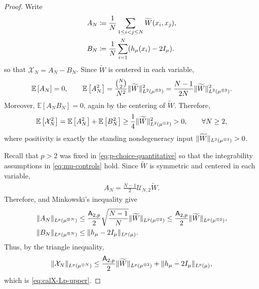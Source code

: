 \documentclass[11pt,reqno]{amsart}
\numberwithin{equation}{section}
\theoremstyle{plain}
\theoremstyle{remark}
\DeclarePairedDelimiter{\pa}{\lparen}{\rparen}
\DeclarePairedDelimiter{\norm}{\lVert}{\rVert}
\newcommand{\E}{{\mathbb{E}}}
\newcommand{\tl}{\widetilde}
\begin{document}
\begin{proof}
Write
\begin{align}
 A_N&\coloneqq \frac1N\sum_{1\le i<j\le N}\tl W(x_i,x_j),
 \label{eq:AN-product-def}\\
 B_N&\coloneqq \frac1N\sum_{i=1}^N\pa{h_\mu(x_i)-2I_\mu}.
 \label{eq:BN-product-def}
\end{align}
so that \(\mathcal X_N=A_N-B_N\).  Since \(\tl W\) is centered in each variable,
\begin{align}\label{eq:AN-product-moments}
 \E\left[A_N\right]=0,
 \qquad
 \E\left[A_N^2\right]=\frac{\binom{N}{2}}{N^2}\norm{\tl W}_{L^2(\mu^{\otimes2})}^2
 =\frac{N-1}{2N}\norm{\tl W}_{L^2(\mu^{\otimes2})}^2.
\end{align}
Moreover, \(\E\left[A_NB_N\right]=0\), again by the centering of \(\tl W\).  Therefore,
\begin{align}\label{eq:calX-second-lower}
 \E\left[\mathcal X_N^2\right]=\E\left[A_N^2\right]+\E\left[B_N^2\right]
 \ge \frac14\norm{\tl W}_{L^2(\mu^{\otimes2})}^2>0,
 \qquad \forall N\ge2,
\end{align}
where positivity is exactly the standing nondegeneracy input
\(\norm{\tl W}_{L^2(\mu^{\otimes2})}>0\).

Recall that \(p>2\) was fixed in \eqref{eq:p-choice-quantitative} so that the integrability assumptions in \eqref{eq:mu-controls} hold.  Since \(\tl W\) is symmetric and centered in each variable,
\begin{align}\label{eq:AN-as-ordered-U-statistic}
 A_N=\frac{N-1}{2}\mathcal U_{N,2}\tl W.
\end{align}
Therefore,  and Minkowski's inequality give
\begin{align}
 \norm{A_N}_{L^p(\mu^{\otimes N})}
 &\le \frac{\mathsf A_{2,p}}2\sqrt{\frac{N-1}{N}}
 \norm{\tl W}_{L^p(\mu^{\otimes2})}
 \le \frac{\mathsf A_{2,p}}2\norm{\tl W}_{L^p(\mu^{\otimes2})},
 \label{eq:AN-Lp-fixed-order}\\
 \norm{B_N}_{L^p(\mu^{\otimes N})}
 &\le \norm{h_\mu-2I_\mu}_{L^p(\mu)}.
 \label{eq:BN-Lp-bound}
\end{align}
Thus, by the triangle inequality,
\begin{align}\label{eq:calX-Lp-from-components}
 \norm{\mathcal X_N}_{L^p(\mu^{\otimes N})}
 \le \frac{\mathsf A_{2,p}}2\norm{\tl W}_{L^p(\mu^{\otimes2})}
 +\norm{h_\mu-2I_\mu}_{L^p(\mu)},
\end{align}
which is \eqref{eq:calX-Lp-upper}.
\end{proof}
\end{document}
